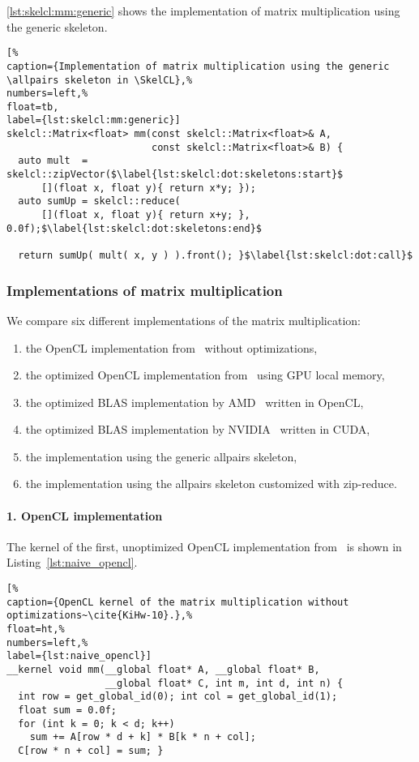 \autoref{lst:skelcl:mm:generic} shows the implementation of matrix multiplication using the generic \allpairs skeleton.
\begin{lstlisting}[%                                                             
caption={Implementation of matrix multiplication using the generic \allpairs skeleton in \SkelCL},%
numbers=left,%
float=tb,
label={lst:skelcl:mm:generic}]
skelcl::Matrix<float> mm(const skelcl::Matrix<float>& A,
                         const skelcl::Matrix<float>& B) {
  auto mult  = skelcl::zipVector($\label{lst:skelcl:dot:skeletons:start}$
      [](float x, float y){ return x*y; });
  auto sumUp = skelcl::reduce(
      [](float x, float y){ return x+y; }, 0.0f);$\label{lst:skelcl:dot:skeletons:end}$

  return sumUp( mult( x, y ) ).front(); }$\label{lst:skelcl:dot:call}$
\end{lstlisting}

\subsubsection*{Implementations of matrix multiplication}
We compare six different implementations of the matrix multiplication:
\begin{enumerate}
  \item the OpenCL implementation from~\cite{KiHw-10} without optimizations,
  \item the optimized OpenCL implementation from~\cite{KiHw-10} using GPU local memory,
  \item the optimized BLAS implementation by AMD~\cite{AMD-13} written in OpenCL,
  \item the optimized BLAS implementation by NVIDIA~\cite{NVIDIA-13} written in CUDA,
  \item the implementation using the generic allpairs skeleton,
  \item the implementation using the allpairs skeleton customized with zip-reduce.
\end{enumerate}

\paragraph{1. OpenCL implementation}
The kernel of the first, unoptimized OpenCL implementation from~\cite{KiHw-10} is shown in Listing~\ref{lst:naive_opencl}.
\begin{lstlisting}[%                                                             
caption={OpenCL kernel of the matrix multiplication without optimizations~\cite{KiHw-10}.},%
float=ht,%
numbers=left,%
label={lst:naive_opencl}]
__kernel void mm(__global float* A, __global float* B,
                 __global float* C, int m, int d, int n) {
  int row = get_global_id(0); int col = get_global_id(1);
  float sum = 0.0f;
  for (int k = 0; k < d; k++)
    sum += A[row * d + k] * B[k * n + col];
  C[row * n + col] = sum; }
\end{lstlisting}

